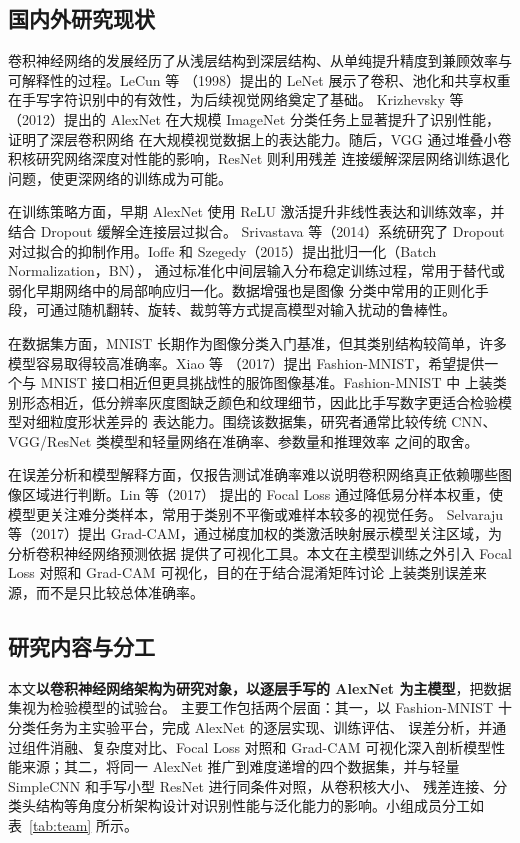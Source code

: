 \documentclass[12pt,a4paper,fontset=fandol]{ctexart}
\numberwithin{figure}{section}
\numberwithin{table}{section}
\numberwithin{equation}{section}
\begin{document}
\subsection{国内外研究现状}
卷积神经网络的发展经历了从浅层结构到深层结构、从单纯提升精度到兼顾效率与可解释性的过程。LeCun 等
（1998）提出的 LeNet 展示了卷积、池化和共享权重在手写字符识别中的有效性，为后续视觉网络奠定了基础。
Krizhevsky 等（2012）提出的 AlexNet 在大规模 ImageNet 分类任务上显著提升了识别性能，证明了深层卷积网络
在大规模视觉数据上的表达能力。随后，VGG 通过堆叠小卷积核研究网络深度对性能的影响，ResNet 则利用残差
连接缓解深层网络训练退化问题，使更深网络的训练成为可能。

在训练策略方面，早期 AlexNet 使用 ReLU 激活提升非线性表达和训练效率，并结合 Dropout 缓解全连接层过拟合。
Srivastava 等（2014）系统研究了 Dropout 对过拟合的抑制作用。Ioffe 和 Szegedy（2015）提出批归一化（Batch Normalization，BN），
通过标准化中间层输入分布稳定训练过程，常用于替代或弱化早期网络中的局部响应归一化。数据增强也是图像
分类中常用的正则化手段，可通过随机翻转、旋转、裁剪等方式提高模型对输入扰动的鲁棒性。

在数据集方面，MNIST 长期作为图像分类入门基准，但其类别结构较简单，许多模型容易取得较高准确率。Xiao 等
（2017）提出 Fashion-MNIST，希望提供一个与 MNIST 接口相近但更具挑战性的服饰图像基准。Fashion-MNIST 中
上装类别形态相近，低分辨率灰度图缺乏颜色和纹理细节，因此比手写数字更适合检验模型对细粒度形状差异的
表达能力。围绕该数据集，研究者通常比较传统 CNN、VGG/ResNet 类模型和轻量网络在准确率、参数量和推理效率
之间的取舍。

在误差分析和模型解释方面，仅报告测试准确率难以说明卷积网络真正依赖哪些图像区域进行判断。Lin 等（2017）
提出的 Focal Loss 通过降低易分样本权重，使模型更关注难分类样本，常用于类别不平衡或难样本较多的视觉任务。
Selvaraju 等（2017）提出 Grad-CAM，通过梯度加权的类激活映射展示模型关注区域，为分析卷积神经网络预测依据
提供了可视化工具。本文在主模型训练之外引入 Focal Loss 对照和 Grad-CAM 可视化，目的在于结合混淆矩阵讨论
上装类别误差来源，而不是只比较总体准确率。

\subsection{研究内容与分工}
本文\textbf{以卷积神经网络架构为研究对象，以逐层手写的 AlexNet 为主模型}，把数据集视为检验模型的试验台。
主要工作包括两个层面：其一，以 Fashion-MNIST 十分类任务为主实验平台，完成 AlexNet 的逐层实现、训练评估、
误差分析，并通过组件消融、复杂度对比、Focal Loss 对照和 Grad-CAM 可视化深入剖析模型性能来源；其二，将同一
AlexNet 推广到难度递增的四个数据集，并与轻量 SimpleCNN 和手写小型 ResNet 进行同条件对照，从卷积核大小、
残差连接、分类头结构等角度分析架构设计对识别性能与泛化能力的影响。小组成员分工如表~\ref{tab:team} 所示。
\end{document}
